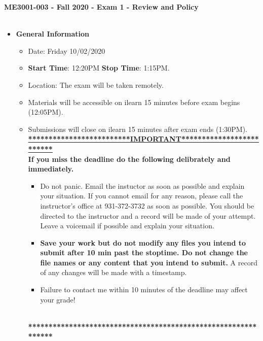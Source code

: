\documentclass[11pt]{article}
\begin{document}
\textbf{ \LARGE ME3001-003 - Fall 2020 - Exam 1 - Review and Policy  } \\\\

\begin{itemize}
	\item  \textbf{\Large General Information}

	\begin{itemize}

		\item Date: Friday 10/02/2020
		\item {\bf Start Time}: 12:20PM {\bf Stop Time}: 1:15PM.
		\item Location: The exam will be taken remotely. 
		 
		\item Materials will be accessible on ilearn 15 minutes before exam begins (12:05PM).
		\item Submissions will close on ilearn 15 minutes after exam ends (1:30PM). \vspace{1mm}\\
		
		{\R  \bf \underline{*************************IMPORTANT*************************}} \vspace{3mm}\\
			  {\R \bf If you miss the deadline do the following delibrately and immediately. }
		\begin{itemize}
			\item Do not panic. Email the instuctor as soon as possible and explain your situation. If you cannot email for any reason, please call the instructor's office at 931-372-3732 as soon as possible. You should be directed to the instructor and a record will be made of your attempt. Leave a voicemail if possible and explain your situation.
			\item{\bf  Save your work but do not modify any files you intend to submit after 10 min past the stoptime. Do not change the file names or any content that you intend to submit.} A record of any changes will be made with a timestamp. \vspace{2mm}
			\item {\R Failure to contact me within 10 minutes of the deadline may affect your grade!}
		\end{itemize}
			{\R  \bf \underline{\hspace{140mm}}} \\
			{\R  \bf ***************************************************************} 
	\end{itemize}


\end{itemize}
\end{document}
